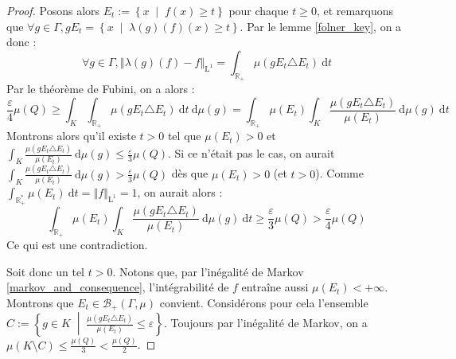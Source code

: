 \documentclass[a4paper,12pt]{article}
\newcommand{\R}{\mathbb{R}}
\newcommand{\Bor}{\mathcal{B}}
\newcommand{\norm}[1]{\left\Vert #1\right\Vert}
\newcommand{\set}[1]{\left\{ #1 \right\}}
\newcommand{\integral}[4]{\int_{#1}^{#2} #3~\mathrm{d}#4}
\newcommand{\tq}{\;\middle|\;}
\begin{document}
\begin{proof}
    Posons alors $E_t := \set{x\tq f(x)\geq t}$ pour chaque $t\geq0$, et remarquons que 
    $\forall g\in\Gamma, gE_t = \set{x\tq \lambda(g)(f)(x) \geq t}$. Par le lemme \ref{folner_key}, on a donc :
    \begin{equation*}
        \forall g\in\Gamma, \norm{\lambda(g)(f) - f}_{\mathrm{L}^1} = \integral{\R_+}{}{\mu(gE_t\triangle E_t)}{t}
    \end{equation*}
    Par le théorème de Fubini, on a alors :
    \begin{equation*}
        \frac\varepsilon4\mu(Q) \geq \integral{K}{}{\integral{\R_+}{}{\mu(gE_t\triangle E_t)}{t}}{\mu(g)} = \integral{\R_+}{}{\mu(E_t)\integral{K}{}{\frac{\mu(gE_t\triangle E_t)}{\mu(E_t)}}{\mu(g)}}{t}
    \end{equation*}
    Montrons alors qu'il existe $t>0$ tel que $\mu(E_t)>0$ et $\integral{K}{}{\frac{\mu(gE_t\triangle E_t)}{\mu(E_t)}}{\mu(g)} \leq\frac\varepsilon3\mu(Q)$. Si ce n'était pas le cas, on aurait
    $\integral{K}{}{\frac{\mu(gE_t\triangle E_t)}{\mu(E_t)}}{\mu(g)} >\frac\varepsilon3\mu(Q)$ dès que $\mu(E_t)>0$ (et $t>0$). Comme 
    $\integral{\R_+^*}{}{\mu(E_t)}{t} = \norm{f}_{\mathrm{L}^1} = 1$, on aurait alors :
    \begin{equation*}
        \integral{\R_+}{}{\mu(E_t)\integral{K}{}{\frac{\mu(gE_t\triangle E_t)}{\mu(E_t)}}{\mu(g)}}{t}\geq\frac\varepsilon3\mu(Q)>\frac\varepsilon4\mu(Q)
    \end{equation*} 
    Ce qui est une contradiction. 

    Soit donc un tel $t>0$. Notons que, par l'inégalité de Markov \ref{markov_and_consequence}, 
    l'intégrabilité de $f$ entraîne aussi $\mu(E_t)<+\infty$. Montrons que $E_t\in\Bor_+(\Gamma, \mu)$ convient.
    Considérons pour cela l'ensemble $C:=\set{g\in K\tq \frac{\mu(gE_t\triangle E_t)}{\mu(E_t)}\leq\varepsilon}$.
    Toujours par l'inégalité de Markov, on a $\mu(K\setminus C)\leq\frac{\mu(Q)}{3}<\frac{\mu(Q)}{2}$.


\end{proof}
\end{document}
